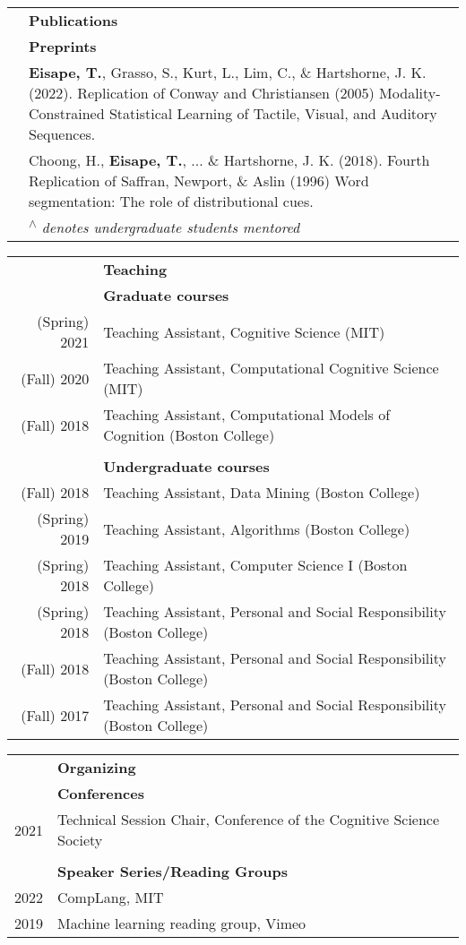\documentclass[letterpaper, 11pt]{article}
\newcommand{\headingfont}{\Large\color{Black}}
\newenvironment{SectionTable}[1]{
	\renewcommand*{\arraystretch}{1.7}
	\setlength{\tabcolsep}{10pt}
	\begin{longtable}{Rp{5.2in}} & #1 \\}
{\end{longtable}\vspace{-.3cm}}
\newenvironment{SectionTableHalfSpace}[1]{
	\renewcommand*{\arraystretch}{.9}
	\setlength{\tabcolsep}{10pt}
	\begin{longtable}{Rp{5.2in}} & #1 \\[0.3em]}
{\end{longtable}\vspace{-.3cm}}
\begin{document}
\begin{SectionTable}{\headingfont \textbf{Publications}}
 
 & \textbf{Preprints}\\
 & \textbf{Eisape, T.}, Grasso, S., Kurt, L., Lim, C., \& Hartshorne, J. K. (2022). Replication of Conway and Christiansen (2005) Modality-Constrained Statistical Learning of Tactile, Visual, and Auditory Sequences.\\
& Choong, H., \textbf{Eisape, T.}, ... \& Hartshorne, J. K. (2018). Fourth Replication of Saffran, Newport, \& Aslin (1996) Word segmentation: The role of distributional cues.\\

 
 & \textit{\textsuperscript{$\wedge$} denotes undergraduate students mentored}
 \end{SectionTable}

\begin{SectionTableHalfSpace}{\headingfont \textbf{Teaching}}
 & 
\textbf{Graduate courses}
\\

(Spring) 2021 	 &
 Teaching Assistant, Cognitive Science (MIT) 
 \\
(Fall) 2020  &	Teaching Assistant, Computational Cognitive Science (MIT)
 \\
 (Fall) 2018  &	Teaching Assistant, Computational Models of Cognition (Boston College)
 \\
\\

 & 
\textbf{Undergraduate courses}
\\

(Fall) 2018 	 &
 Teaching Assistant, Data Mining (Boston College)
 \\
(Spring) 2019 &	Teaching Assistant, Algorithms (Boston College)
 \\
 (Spring) 2018 &	Teaching Assistant, Computer Science I (Boston College)
 \\
 (Spring) 2018 	 &
 Teaching Assistant, Personal and Social Responsibility (Boston College)\\
 (Fall) 2018 	 &
 Teaching Assistant, Personal and Social Responsibility (Boston College)\\
 (Fall) 2017 	 &
 Teaching Assistant, Personal and Social Responsibility (Boston College)\\
\end{SectionTableHalfSpace}



\begin{SectionTableHalfSpace}{\headingfont \textbf{Organizing}}
& \textbf{Conferences}\\
2021 & Technical Session Chair, Conference of the Cognitive Science Society\\
\\

& \textbf{Speaker Series/Reading Groups}\\
2022 & CompLang, MIT\\
2019 & Machine learning reading group, Vimeo\\
\end{SectionTableHalfSpace}
\end{document}
